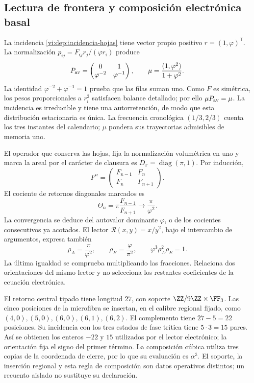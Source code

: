 \subsection{Lectura de frontera y composición electrónica basal}
\label{vi:dep:basal}

La incidencia \eqref{vi:dep:incidencia-hojas} tiene vector propio
positivo \(r=(1,\varphi)^{\mathsf T}\). La normalización
\(p_{ij}=F_{ij}r_j/(\varphi r_i)\) produce
\[
 P_{\rm av}=\begin{pmatrix}0&1\\\varphi^{-2}&\varphi^{-1}\end{pmatrix},
 \qquad \mu=\frac{(1,\varphi^2)}{1+\varphi^2}.
\]
La identidad \(\varphi^{-2}+\varphi^{-1}=1\) prueba que las filas
suman uno. Como \(F\) es simétrica, los pesos proporcionales a
\(r_i^2\) satisfacen balance detallado; por ello \(\mu P_{\rm av}=\mu\).
La incidencia es irreducible y tiene una autorretención, de modo que
esta distribución estacionaria es única. La frecuencia cronológica
\((1/3,2/3)\) cuenta los tres instantes del calendario; \(\mu\)
pondera sus trayectorias admisibles de memoria uno.

El operador que conserva las hojas, fija la normalización volumétrica
en uno y marca la areal por el carácter de clausura es
\(D_\pi=\operatorname{diag}(\pi,1)\). Por inducción,
\[
 F^n=\begin{pmatrix}F_{n-1}&F_n\\F_n&F_{n+1}\end{pmatrix}.
\]
El cociente de retornos diagonales marcados es
\[
 \Theta_n=\pi\frac{F_{n-1}}{F_{n+1}}
 \longrightarrow\frac{\pi}{\varphi^2}.
\]
La convergencia se deduce del autovalor dominante \(\varphi\), o de
los cocientes consecutivos ya acotados. El lector
\(\mathcal R(x,y)=x/y^2\), bajo el intercambio de argumentos,
expresa también
\begin{equation}
 \rho_A=\frac{\pi}{\varphi^2},\qquad
 \rho_E=\frac{\varphi}{\pi^2},\qquad
 \varphi^3\rho_A^2\rho_E=1.
 \label{vi:dep:dos-orientaciones}
\end{equation}
La última igualdad se comprueba multiplicando las fracciones.
Relaciona dos orientaciones del mismo lector y no selecciona los
restantes coeficientes de la ecuación electrónica.

El retorno central tipado tiene longitud \(27\), con soporte
\(\ZZ/9\ZZ\times\FF_3\). Las cinco posiciones de la microfibra
se insertan, en el calibre regional fijado, como
\((4,0),(5,0),(6,0),(6,1),(6,2)\).
El complemento tiene \(27-5=22\) posiciones. Su incidencia con los
tres estados de fase trítica tiene \(5\cdot3=15\) pares.
Así se obtienen los enteros \(-22\) y \(15\) utilizados por el
lector electrónico; la orientación fija el signo del primer término.
La composición cúbica utiliza tres copias de la coordenada de cierre,
por lo que su evaluación es \(\alpha^3\). El soporte, la inserción
regional y esta regla de composición son datos operativos distintos;
un recuento aislado no sustituye su declaración.

